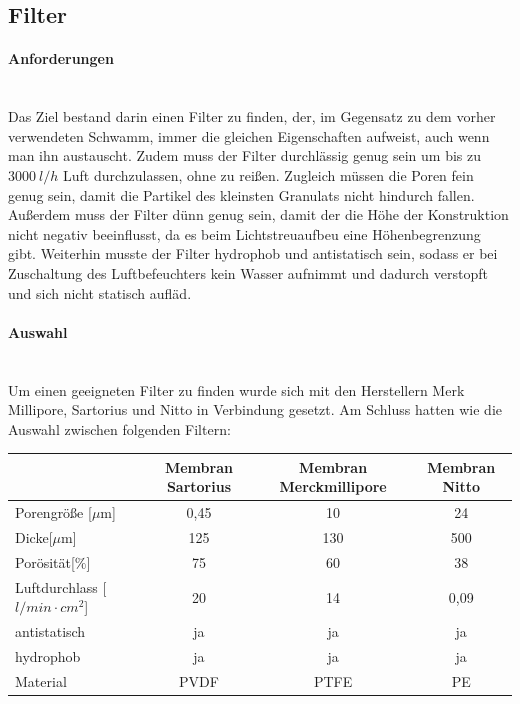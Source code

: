 \subsection{Filter}

\paragraph{Anforderungen}
\hfill \\
Das Ziel bestand darin einen Filter zu finden, der, im Gegensatz zu dem vorher verwendeten Schwamm, immer die gleichen Eigenschaften aufweist, auch wenn man ihn austauscht. Zudem muss der Filter durchlässig genug sein um bis zu $\SI{3000}{l/h}$ Luft durchzulassen, ohne zu reißen. Zugleich müssen die Poren fein genug sein, damit die Partikel des kleinsten Granulats nicht hindurch fallen. Außerdem muss der Filter dünn genug sein, damit der die Höhe der Konstruktion nicht negativ beeinflusst, da es beim Lichtstreuaufbeu eine Höhenbegrenzung gibt. Weiterhin musste der Filter hydrophob und antistatisch sein, sodass er bei Zuschaltung des Luftbefeuchters kein Wasser aufnimmt und dadurch verstopft und sich nicht statisch aufläd.


\paragraph{Auswahl}
\hfill \\
Um einen geeigneten Filter zu finden wurde sich mit den Herstellern Merk Millipore, Sartorius und Nitto in Verbindung gesetzt. Am Schluss hatten wie die Auswahl zwischen folgenden Filtern:


\begin{center}
			\begin{tabular}{l|c|c|c}
				& Membran Sartorius & Membran Merckmillipore & Membran Nitto \\
				\hline
				Porengröße [$\mu$m] & 0,45  & 10    & 24 \\
				Dicke[$\mu$m] & 125 & 130 & 500 \\
				Porösität[$\%$] & 75    & 60    & 38 \\
				Luftdurchlass [$l/min \cdot cm^2$] & 20    & 14    & 0,09 \\
				antistatisch & ja    & ja    & ja \\
				hydrophob & ja    & ja    & ja \\
				Material & PVDF \footnotemark[1]  & PTFE \footnotemark[2]  & PE \footnotemark[3] \\
			\end{tabular}	
\end{center}


















